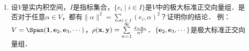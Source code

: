 \begin{enumerate}
\item 设$V$是实内积空间，$I$是指标集合，$\{e_i\mid i\in I\}$是$V$中的极大标准正交向量组．是否对于任意$\alpha\in V$，都有$\|\alpha\|^2=\sum\limits_{i\in I}(e_i,\alpha)^2$？证明你的结论．
例：$V=\Span({\bf 1},{\bf e}_2,{\bf e}_3,\cdots)$，$\rho({\bf x,y})=\sum\limits_{n=1}^\infty\frac{x_ny_n}{n^2}$．$\{{\bf e}_2,{\bf e}_3,\cdots\}$是极大标准正交向量组．
\end{enumerate}

